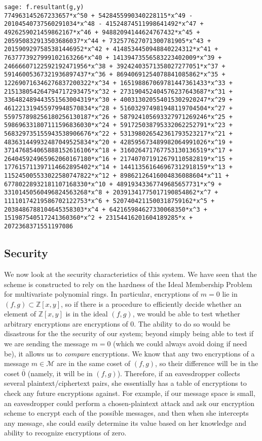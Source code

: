 \documentclass[11pt]{report}
\newcommand{\M}{\mathcal{M}}
\newcommand{\Zxy}{\mathbb{Z}[x,y]}
\begin{document}
\begin{verbatim}
sage: f.resultant(g,y)
774963145267233657*x^50 + 5428455990340228115*x^49 - 20104540737560291034*x^48 - 41524874511998641492*x^47 + 4926259021459862167*x^46 + 94882094144624767432*x^45 + 205950832913503686037*x^44 + 732577627071300781905*x^43 + 2015909297585381446952*x^42 + 4148534450948840224312*x^41 + 7637773927999102163266*x^40 + 14139473556583223402009*x^39 + 24666607122592192471956*x^38 + 39242403571358027277051*x^37 + 59146005367321936897437*x^36 + 86940691254078841085862*x^35 + 122690716346276837200322*x^34 + 165198867069781447361433*x^33 + 215138054264794717293475*x^32 + 273190452404576237643687*x^31 + 336482489443551563004319*x^30 + 400313020554015302920247*x^29 + 461221319455979948570834*x^28 + 516032974981948119704504*x^27 + 559757898256180256130187*x^26 + 587924105693327971269246*x^25 + 598696331807111596836030*x^24 + 591725038795332062252791*x^23 + 568329735155943538906676*x^22 + 531398026542361793523217*x^21 + 483631449932487049525834*x^20 + 428595673489982064991026*x^19 + 371476854065888152616106*x^18 + 316026471767753130136519*x^17 + 264045924965962060167180*x^16 + 217407071912679110582819*x^15 + 177615711397114662895402*x^14 + 144113561646967312918159*x^13 + 115245005533022580747822*x^12 + 89862126416004836088604*x^11 + 67780228932181107168330*x^10 + 48919343367749685657731*x^9 + 33101450560496824563268*x^8 + 20391341775017190854862*x^7 + 11110174219586702122753*x^6 + 5207404211500318759162*x^5 + 2038486788104645358303*x^4 + 642165984627330068350*x^3 + 151987540517241360360*x^2 + 23154416201604189285*x + 2072368371551197086

\end{verbatim}


\subsection{Security}
\label{sec:mv_security}
We now look at the security characteristics of this system. We have seen that the scheme is constructed to rely on the hardness of the Ideal Membership Problem for multivariate polynomial rings. In particular, encryptions of $m=0$ lie in $(f,g)\subset \Zxy$, so if there is a procedure to efficiently decide whether an element of $\Zxy$ is in the ideal $(f,g)$, we would be able to test whether arbitrary encryptions are encryptions of $0$. The ability to do so would be disastrous for the the security of our system; beyond simply being able to test if we are sending the message $m=0$ (which we could always avoid doing if need be), it allows us to \emph{compare} encryptions. We know that any two encryptions of a message $m\in \M$ are in the same coset of $(f,g)$, so their difference will be in the coset $\bar{0}$ (namely, it will be in $(f,g)$). Therefore, if an eavesdropper collects several plaintext/ciphertext pairs, she essentially has a table of encryptions to check any future encryptions against. For example, if our message space is small, an eavesdropper could perform a chosen-plaintext attack and ask our encryption scheme to encrypt each of the possible messages, and then when she intercepts any message, she could easily determine its value based on her knowledge and ability to recognize encryptions of zero.
\end{document}
